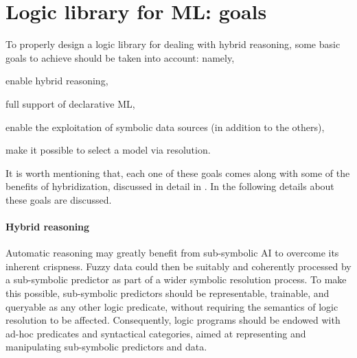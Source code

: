 \documentclass[runningheads]{llncs}
\begin{document}
%

\section{Logic library for ML: goals}\label{sec:goals}

To properly design a logic library for dealing with hybrid reasoning, some basic goals to achieve should be taken into account: namely,
%
\begin{inlinelist}
    \item enable hybrid reasoning,
    \item full support of declarative ML,
    \item enable the exploitation of symbolic data sources (in addition to the others),
    \item make it possible to select a model via resolution.
\end{inlinelist}
%
It is worth mentioning that, each one of these goals comes along with some of the benefits of hybridization, discussed in detail in \cite{xaisurvey-ia14}.
%
In the following details about these goals are discussed.

\paragraph{Hybrid reasoning}
%
Automatic reasoning may greatly benefit from sub-symbolic AI to overcome its inherent crispness.
%
Fuzzy data could then be suitably and coherently processed by a sub-symbolic predictor as part of a wider symbolic resolution process.
%
To make this possible, sub-symbolic predictors should be representable, trainable, and queryable as any other logic predicate, without requiring the semantics of logic resolution to be affected.
%
Consequently, logic programs should be endowed with ad-hoc predicates and syntactical categories, aimed at representing and manipulating sub-symbolic predictors and data.
\end{document}
